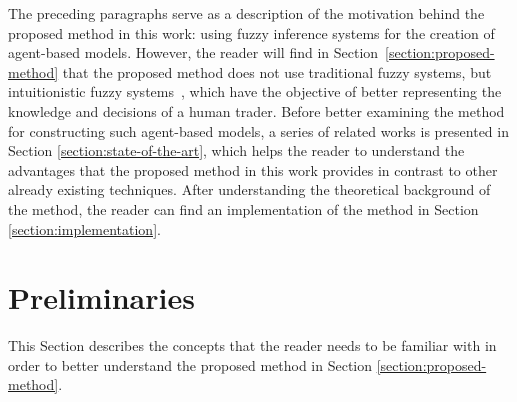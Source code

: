 \documentclass{ieeeaccess}
\begin{document}


The preceding paragraphs serve as a description of the motivation behind the
proposed method in this work: using fuzzy inference systems for the creation of
agent-based models. %
However, the reader will find in Section~\ref{section:proposed-method} that the proposed method does not use traditional
fuzzy systems, but intuitionistic fuzzy systems~\cite{Atanassov1986}, which have
the objective of better representing the knowledge and decisions of a human
trader. Before better examining the method for constructing such agent-based
models, a series of related works is presented in Section
\ref{section:state-of-the-art}, which helps the reader to understand the advantages
that the proposed method in this work provides in contrast to other already
existing techniques. After understanding the theoretical background of the
method, the reader can find an implementation of the method in Section
\ref{section:implementation}.
%


\section{Preliminaries}
\label{section:preliminaries}
%

This Section describes the concepts that the reader needs to be familiar with in
order to better understand the proposed method in Section
\ref{section:proposed-method}.%
\end{document}
